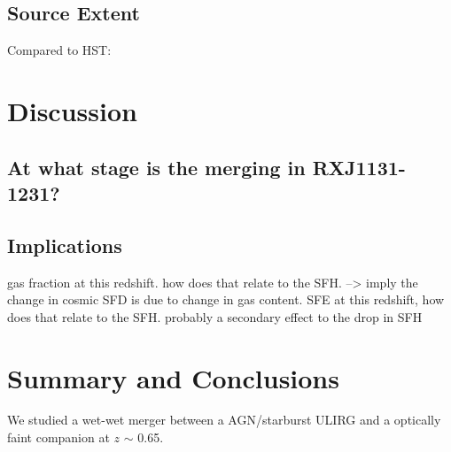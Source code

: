 \documentclass[]{emulateapj}
\begin{document}
\subsection{Source Extent}
Compared to HST:

\section{Discussion}
\subsection{At what stage is the merging in RXJ1131-1231?}



\subsection{Implications} gas fraction at this redshift. how does that relate to
the SFH. --> imply the change in cosmic SFD is due to change in gas content. SFE
at this redshift, how does that relate to the SFH. probably a secondary effect
to the drop in SFH


\section{Summary and Conclusions}
We studied a wet-wet merger between a AGN/starburst ULIRG and a optically faint companion at $z$ $\sim$ 0.65.







\acknowledgments




\end{document}
